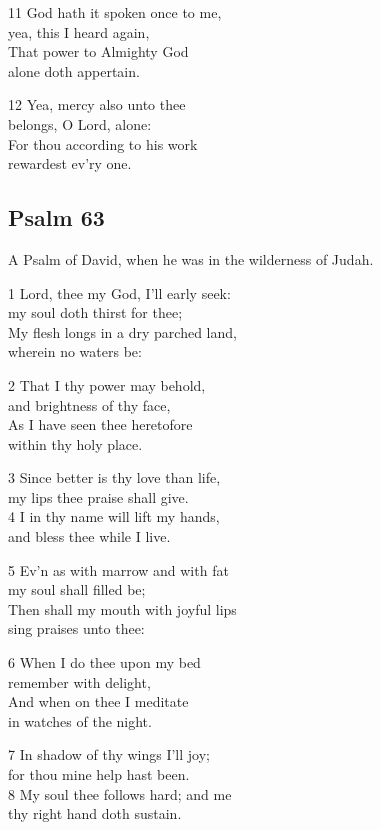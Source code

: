 \begin{multicols}{3}
11 God hath it spoken once to me,\\
yea, this I heard again,\\
That power to Almighty God\\
alone doth appertain.

12 Yea, mercy also unto thee\\
belongs, O Lord, alone:\\
For thou according to his work\\
rewardest ev’ry one.

\begin{center}
\quad{}\quad{}
\end{center}

\subsection*{Psalm 63}

A Psalm of David, when he was in the wilderness of Judah.

1 Lord, thee my God, I’ll early seek:\\
my soul doth thirst for thee;\\
My flesh longs in a dry parched land,\\
wherein no waters be:

2 That I thy power may behold,\\
and brightness of thy face,\\
As I have seen thee heretofore\\
within thy holy place.

3 Since better is thy love than life,\\
my lips thee praise shall give.\\
4 I in thy name will lift my hands,\\
and bless thee while I live.

5 Ev’n as with marrow and with fat\\
my soul shall filled be;\\
Then shall my mouth with joyful lips\\
sing praises unto thee:

6 When I do thee upon my bed\\
remember with delight,\\
And when on thee I meditate\\
in watches of the night.

7 In shadow of thy wings I’ll joy;\\
for thou mine help hast been.\\
8 My soul thee follows hard; and me\\
thy right hand doth sustain.


\end{multicols}
